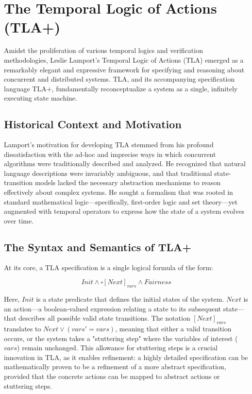 \section{The Temporal Logic of Actions (TLA+)}

Amidst the proliferation of various temporal logics and verification methodologies, Leslie Lamport's Temporal Logic of Actions (TLA) emerged as a remarkably elegant and expressive framework for specifying and reasoning about concurrent and distributed systems. TLA, and its accompanying specification language TLA+, fundamentally reconceptualize a system as a single, infinitely executing state machine.

\subsection{Historical Context and Motivation}

Lamport's motivation for developing TLA stemmed from his profound dissatisfaction with the ad-hoc and imprecise ways in which concurrent algorithms were traditionally described and analyzed. He recognized that natural language descriptions were invariably ambiguous, and that traditional state-transition models lacked the necessary abstraction mechanisms to reason effectively about complex systems. He sought a formalism that was rooted in standard mathematical logic---specifically, first-order logic and set theory---yet augmented with temporal operators to express how the state of a system evolves over time.

\subsection{The Syntax and Semantics of TLA+}

At its core, a TLA specification is a single logical formula of the form:

$$ Init \land \square [Next]_{vars} \land Fairness $$

Here, $Init$ is a state predicate that defines the initial states of the system. $Next$ is an action---a boolean-valued expression relating a state to its subsequent state---that describes all possible valid state transitions. The notation $[Next]_{vars}$ translates to $Next \lor (vars' = vars)$, meaning that either a valid transition occurs, or the system takes a "stuttering step" where the variables of interest ($vars$) remain unchanged. This allowance for stuttering steps is a crucial innovation in TLA, as it enables refinement: a highly detailed specification can be mathematically proven to be a refinement of a more abstract specification, provided that the concrete actions can be mapped to abstract actions or stuttering steps.

